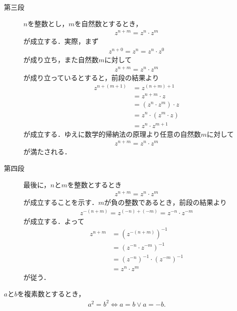 \begin{sketch}
\begin{description}
			\item[第三段]
				$n$を整数とし，$m$を自然数とするとき，
				\begin{align}
					z^{n+m} = z^{n} \cdot z^{m}
				\end{align}
				が成立する．実際，まず
				\begin{align}
					z^{n+0} = z^{n} = z^{n} \cdot z^{0}
				\end{align}
				が成り立ち，また自然数$m$に対して
				\begin{align}
					z^{n+m} = z^{n} \cdot z^{m}
				\end{align}
				が成り立っているとすると，前段の結果より
				\begin{align}
					z^{n+(m+1)} &= z^{(n+m)+1} \\
					&= z^{n+m} \cdot z \\
					&= (z^{n} \cdot z^{m}) \cdot z \\
					&= z^{n} \cdot (z^{m} \cdot z) \\
					&= z^{n} \cdot z^{m+1}
				\end{align}
				が成立する．ゆえに数学的帰納法の原理より任意の自然数$m$に対して
				\begin{align}
					z^{n+m} = z^{n} \cdot z^{m}
				\end{align}
				が満たされる．
				
			\item[第四段]
				最後に，$n$と$m$を整数とするとき
				\begin{align}
					z^{n+m} = z^{n} \cdot z^{m}
				\end{align}
				が成立することを示す．$m$が負の整数であるとき，前段の結果より
				\begin{align}
					z^{-(n+m)} = z^{(-n) + (-m)} = z^{-n} \cdot z^{-m}
				\end{align}
				が成立する．よって
				\begin{align}
					z^{n+m} &= (z^{-(n+m)})^{-1} \\
					&= (z^{-n} \cdot z^{-m})^{-1} \\
					&= (z^{-n})^{-1} \cdot (z^{-m})^{-1} \\
					&= z^{n} \cdot z^{m}
				\end{align}
				が従う．
				\QED
		\end{description}
	\end{sketch}
	
	\begin{screen}
		\begin{thm}[二乗が等しい数同士は一致するか逆元である]
			$a$と$b$を複素数とするとき，
			\begin{align}
				a^2 = b^2 \Longleftrightarrow 
				a = b \vee a = -b.
			\end{align}
		\end{thm}
	\end{screen}
	

